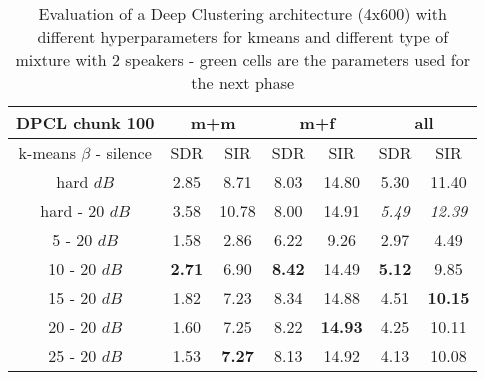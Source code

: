 \documentclass[master,final,11pt]{iscs-thesis}
\begin{document}
\begin{table}[ht]
\centering
\begin{tabular}{c|c|c|c|c|c|c}
DPCL chunk 100 & \multicolumn{2}{c|}{m+m} & \multicolumn{2}{c|}{m+f} & \multicolumn{2}{c}{all} \\ 
\hline 
k-means $\beta$ - silence & SDR & SIR & SDR & SIR & SDR & SIR \\ 
\hline 
hard $dB$ & 2.85 & 8.71 & 8.03 & 14.80 & 5.30 & 11.40 \\ 
hard - 20 $dB$ & 3.58 & 10.78 & 8.00 & 14.91 & \textit{5.49} & \textit{12.39} \\ 
\hline 
\hline 
5 - 20 $dB$ & 1.58 & 2.86 & 6.22 & 9.26 & 2.97 & 4.49 \\ 
10 - 20 $dB$ &  \cellcolor{green}\textbf{2.71} & \cellcolor{green}6.90 & \cellcolor{green}\textbf{8.42} &\cellcolor{green} 14.49 & \cellcolor{green}\textbf{5.12} & \cellcolor{green}9.85 \\ 
15 - 20 $dB$ & 1.82 & 7.23 & 8.34 & 14.88 & 4.51 & \textbf{10.15} \\ 
20 - 20 $dB$ & 1.60 & 7.25 & 8.22 & \textbf{14.93} & 4.25 & 10.11 \\ 
25 - 20 $dB$ & 1.53 & \textbf{7.27} & 8.13 & 14.92 & 4.13 & 10.08 \\ 
\end{tabular}
\captionsetup{justification=centering}
\caption{Evaluation of a Deep Clustering architecture (4x600) with different hyperparameters for kmeans and different type of mixture with 2 speakers - green cells are the parameters used for the next phase}
\label{table:DPCLV1}
\end{table}
\end{document}
